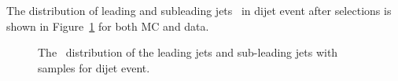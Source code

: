 The distribution of leading and subleading jets \pt~in dijet event after selections is shown in Figure~\ref{fig:QG-2samplePt} for both MC and data.




\begin{figure}[htb]
        \centering
         \quad
         \quad
        \caption[]{
	  The \pt~distribution of the leading jets and sub-leading jets with \pythia samples for dijet event.
                \label{fig:QG-2samplePt}
        }
\end{figure}




